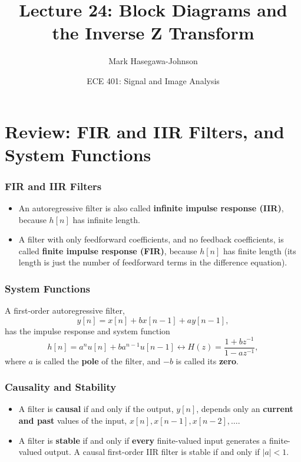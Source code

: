 \documentclass{beamer}
\title{Lecture 24: Block Diagrams and the Inverse Z Transform}
\author{Mark Hasegawa-Johnson}
\date{ECE 401: Signal and Image Analysis}
\begin{document}
\begin{frame}
  \maketitle
\end{frame}

\begin{frame}
  \tableofcontents
\end{frame}

\section[Review]{Review: FIR and IIR Filters, and System Functions}
\setcounter{subsection}{1}

\begin{frame}
  \frametitle{FIR and IIR Filters}
  \begin{itemize}
  \item An autoregressive filter is also called {\bf infinite impulse response (IIR)},
    because $h[n]$ has infinite length.
  \item A filter with only feedforward coefficients, and no feedback coefficients, is called
    {\bf finite impulse response (FIR)}, because $h[n]$ has finite length (its length is
    just the number of feedforward terms in the difference equation).
  \end{itemize}
\end{frame}

\begin{frame}
  \frametitle{System Functions}
  A first-order autoregressive filter,
  \[
  y[n] = x[n]+bx[n-1]+ay[n-1],
  \]
  has the impulse response and system function
  \[
  h[n]=a^n u[n]+ba^{n-1}u[n-1] \leftrightarrow H(z)  = \frac{1+bz^{-1}}{1-az^{-1}},
  \]
  where $a$ is called the {\bf pole} of the filter, and $-b$ is called
  its {\bf zero}.
\end{frame}

\begin{frame}
  \frametitle{Causality and Stability}
  \begin{itemize}
  \item A filter is {\bf causal} if and only if the output, $y[n]$,
    depends only an {\bf current and past} values of the input, $x[n],
    x[n-1],x[n-2],\ldots$.
  \item A filter is {\bf stable} if and only if {\bf every}
    finite-valued input generates a finite-valued output.  A causal
    first-order IIR filter is stable if and only if $|a|<1$.
  \end{itemize}
\end{frame}
\end{document}
